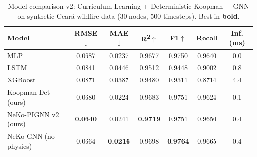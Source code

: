 \begin{table}[htbp]
\centering
\caption{Model comparison v2: Curriculum Learning + Deterministic Koopman + GNN on synthetic Cear\'a wildfire data (30 nodes, 500 timesteps). Best in \textbf{bold}.}
\label{tab:model_comparison_v2}
\small
\begin{tabular}{@{}lcccccc@{}}
\toprule
\textbf{Model} & \textbf{RMSE}$\downarrow$ & \textbf{MAE}$\downarrow$ & \textbf{R\textsuperscript{2}}$\uparrow$ & \textbf{F1}$\uparrow$ & \textbf{Recall} & \textbf{Inf. (ms)} \\
\midrule
MLP & 0.0687 & 0.0237 & 0.9677 & 0.9750 & 0.9640 & 0.0 \\
LSTM & 0.0841 & 0.0446 & 0.9512 & 0.9448 & 0.9002 & 0.8 \\
XGBoost & 0.0871 & 0.0387 & 0.9480 & 0.9311 & 0.8714 & 4.4 \\
Koopman-Det (ours) & 0.0680 & 0.0224 & 0.9683 & 0.9751 & 0.9624 & 0.1 \\
NeKo-PIGNN v2 (ours) & \textbf{0.0640} & 0.0241 & \textbf{0.9719} & 0.9751 & 0.9650 & 0.4 \\
NeKo-GNN (no physics) & 0.0664 & \textbf{0.0216} & 0.9698 & \textbf{0.9764} & 0.9665 & 0.4 \\
\bottomrule
\end{tabular}
\end{table}